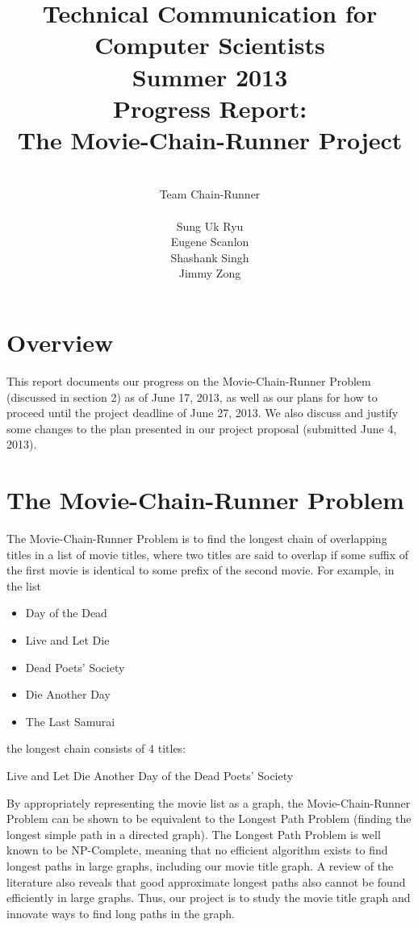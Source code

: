 \documentclass[11pt,english]{article}
\title{
{\normalsize \bf Technical Communication for Computer Scientists\\
Summer 2013}\\
\vspace{4cm}
{\bf Progress Report:\\The Movie-Chain-Runner Project}}
\author{
\\Team Chain-Runner \\\\
Sung Uk Ryu\\
Eugene Scanlon\\
Shashank Singh\\
Jimmy Zong
}
\begin{document}


\tableofcontents

\newpage
{} %
\section{Overview}
This report documents our progress on the Movie-Chain-Runner Problem
(discussed in section 2) as of June 17, 2013, as well as our plans for how to
proceed until the project deadline of June 27, 2013. We also discuss and
justify some changes to the plan presented in our project proposal
(submitted June 4, 2013).

\vspace{-0.2cm}
\section{The Movie-Chain-Runner Problem}
The Movie-Chain-Runner Problem is to find the longest chain of overlapping
titles in a list of movie titles, where two titles are said to overlap if some
suffix of the first movie is identical to some prefix of the second movie. For
example, in the list
\begin{itemize}[noitemsep]
\item Day of the Dead
\item Live and Let Die
\item Dead Poets' Society
\item Die Another Day
\item The Last Samurai
\end{itemize}
the longest chain consists of 4 titles:

\begin{center}
Live and Let Die Another Day of the Dead Poets' Society
\end{center}
By appropriately representing the movie list as a graph, the Movie-Chain-Runner
Problem can be shown to be equivalent to the Longest Path Problem (finding the
longest simple path in a directed graph). The Longest Path Problem is well
known to be NP-Complete, meaning that no efficient algorithm exists to find
longest paths in large graphs, including our movie title graph. A review of the
literature also reveals that good approximate longest paths also cannot be
found efficiently in large graphs. Thus, our project is to study the movie
title graph and innovate ways to find long paths in the graph.
\end{document}
